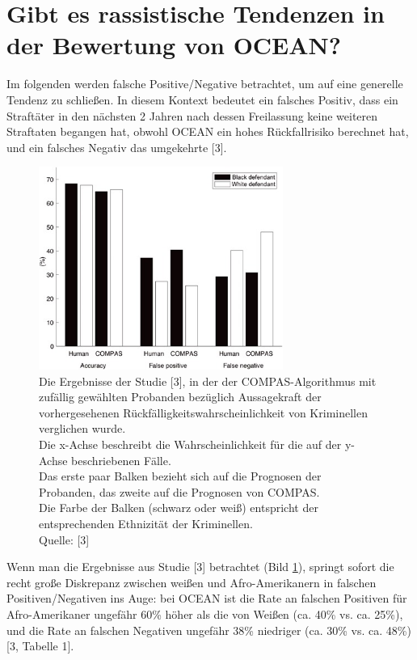 \documentclass[10pt, a4paper, twocolumn]{article} %
\begin{document}
\section{Gibt es rassistische Tendenzen in der Bewertung von OCEAN?}
Im folgenden werden falsche Positive/Negative betrachtet, um auf eine generelle Tendenz zu schließen. 
In diesem Kontext bedeutet ein falsches Positiv, dass ein Straftäter in den nächsten 2 Jahren nach dessen Freilassung keine weiteren Straftaten begangen hat, obwohl OCEAN ein hohes Rückfallrisiko berechnet hat, und ein falsches Negativ das umgekehrte [3].

\begin{figure}[h]
\includegraphics[width=8cm]{image1}
\caption{Die Ergebnisse der Studie [3], in der der COMPAS-Algorithmus mit zufällig gewählten Probanden bezüglich Aussagekraft der vorhergesehenen Rückfälligkeitswahrscheinlichkeit von Kriminellen verglichen wurde.\\ 
Die x-Achse beschreibt die Wahrscheinlichkeit für die auf der y-Achse beschriebenen Fälle. \\
Das erste paar Balken bezieht sich auf die Prognosen der Probanden, das zweite auf die Prognosen von COMPAS. \\
Die Farbe der Balken (schwarz oder weiß) entspricht der entsprechenden Ethnizität der Kriminellen.\\
Quelle: [3] }
\label{img1}
\end{figure}

Wenn man die Ergebnisse aus Studie [3] betrachtet (Bild \ref{img1}), springt sofort die recht große Diskrepanz zwischen weißen und Afro-Amerikanern in falschen Positiven/Negativen ins Auge: bei OCEAN ist die Rate an falschen Positiven für Afro-Amerikaner ungefähr 60\% höher als die von Weißen (ca. 40\% vs. ca. 25\%), und die Rate an falschen Negativen ungefähr 38\% niedriger (ca. 30\% vs. ca. 48\%) [3, Tabelle 1].
\end{document}
